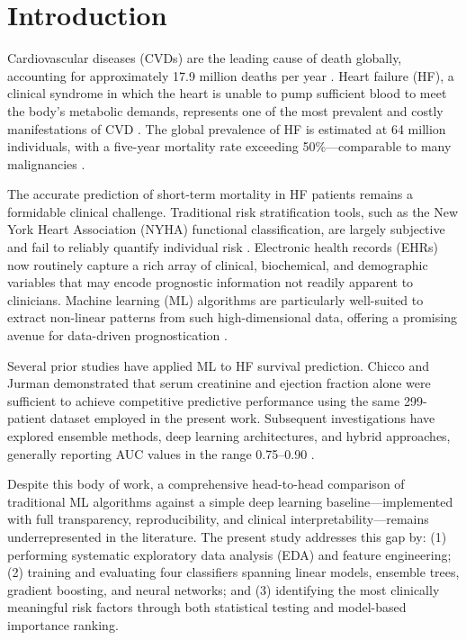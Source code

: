 \documentclass[12pt, a4paper]{article}
\begin{document}
\section{Introduction}
\label{sec:intro}

Cardiovascular diseases (CVDs) are the leading cause of death globally, 
accounting for approximately 17.9 million deaths per year \cite{who2021}. 
Heart failure (HF), a clinical syndrome in which the heart is unable to pump 
sufficient blood to meet the body's metabolic demands, represents one of the 
most prevalent and costly manifestations of CVD \cite{virani2021}. The global 
prevalence of HF is estimated at 64 million individuals, with a five-year 
mortality rate exceeding 50\%—comparable to many malignancies \cite{groenewegen2020}.

The accurate prediction of short-term mortality in HF patients remains a 
formidable clinical challenge. Traditional risk stratification tools, such as 
the New York Heart Association (NYHA) functional classification, are largely 
subjective and fail to reliably quantify individual risk \cite{raphael2007}. 
Electronic health records (EHRs) now routinely capture a rich array of 
clinical, biochemical, and demographic variables that may encode prognostic 
information not readily apparent to clinicians. Machine learning (ML) 
algorithms are particularly well-suited to extract non-linear patterns from 
such high-dimensional data, offering a promising avenue for data-driven 
prognostication \cite{chicco2020}.

Several prior studies have applied ML to HF survival prediction. Chicco and 
Jurman \cite{chicco2020} demonstrated that serum creatinine and ejection 
fraction alone were sufficient to achieve competitive predictive performance 
using the same 299-patient dataset employed in the present work. Subsequent 
investigations have explored ensemble methods, deep learning architectures, 
and hybrid approaches, generally reporting AUC values in the range 
0.75--0.90 \cite{ahmad2017, hu2021}.

Despite this body of work, a comprehensive head-to-head comparison of 
traditional ML algorithms against a simple deep learning baseline—implemented 
with full transparency, reproducibility, and clinical interpretability—remains 
underrepresented in the literature. The present study addresses this gap by: 
(1) performing systematic exploratory data analysis (EDA) and feature 
engineering; (2) training and evaluating four classifiers spanning linear 
models, ensemble trees, gradient boosting, and neural networks; and 
(3) identifying the most clinically meaningful risk factors through both 
statistical testing and model-based importance ranking.
\end{document}
